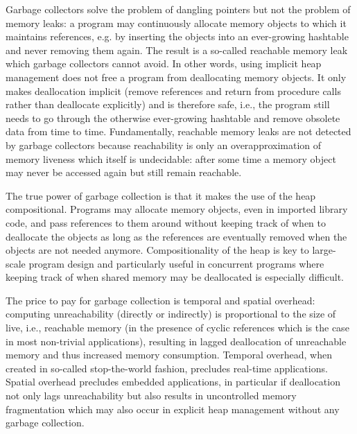 \documentclass{amsart}
\begin{document}
Garbage collectors solve the problem of dangling pointers but not the
problem of memory leaks: a program may continuously allocate memory
objects to which it maintains references, e.g. by inserting the objects
into an ever-growing hashtable and never removing them again.  The
result is a so-called reachable memory leak which garbage collectors
cannot avoid.  In other words, using implicit heap management does not
free a program from deallocating memory objects.  It only makes
deallocation implicit (remove references and return from procedure
calls rather than deallocate explicitly) and is therefore safe, i.e.,
the program still needs to go through the otherwise ever-growing
hashtable and remove obsolete data from time to time.  Fundamentally,
reachable memory leaks are not detected by garbage collectors because
reachability is only an overapproximation of memory liveness which
itself is undecidable: after some time a memory object may never be
accessed again but still remain reachable.

The true power of garbage collection is that it makes the use of the
heap compositional.  Programs may allocate memory objects, even in
imported library code, and pass references to them around without
keeping track of when to deallocate the objects as long as the
references are eventually removed when the objects are not needed
anymore.  Compositionality of the heap is key to large-scale program
design and particularly useful in concurrent programs where keeping
track of when shared memory may be deallocated is especially
difficult.

The price to pay for garbage collection is temporal and spatial
overhead: computing unreachability (directly or indirectly) is
proportional to the size of live, i.e., reachable memory (in the
presence of cyclic references which is the case in most non-trivial
applications), resulting in lagged deallocation of unreachable memory
and thus increased memory consumption.  Temporal overhead, when
created in so-called stop-the-world fashion, precludes real-time
applications.  Spatial overhead precludes embedded applications, in
particular if deallocation not only lags unreachability but also
results in uncontrolled memory fragmentation which may also occur in
explicit heap management without any garbage collection.
\end{document}

